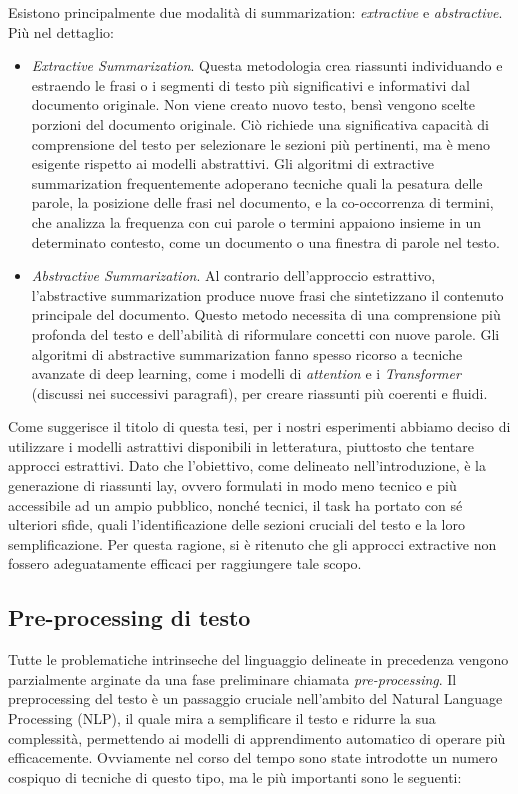 \documentclass[12pt,a4paper,twoside,openright]{book}
\begin{document}
Esistono principalmente due modalità di summarization: \emph{extractive} e \emph{abstractive}.
Più nel dettaglio:
\begin{itemize}
\item \emph{Extractive Summarization}. Questa metodologia crea riassunti individuando e estraendo le frasi o i segmenti di testo più significativi e informativi dal documento originale. Non viene creato nuovo testo, bensì vengono scelte porzioni del documento originale. Ciò richiede una significativa capacità di comprensione del testo per selezionare le sezioni più pertinenti, ma è meno esigente rispetto ai modelli abstrattivi.
Gli algoritmi di extractive summarization frequentemente adoperano tecniche quali la pesatura delle parole, la posizione delle frasi nel documento, e la co-occorrenza di termini, che analizza la frequenza con cui parole o termini appaiono insieme in un determinato contesto, come un documento o una finestra di parole nel testo.
\item \emph{Abstractive Summarization}. Al contrario dell'approccio estrattivo, l'abstractive summarization produce nuove frasi che sintetizzano il contenuto principale del documento. Questo metodo necessita di una comprensione più profonda del testo e dell'abilità di riformulare concetti con nuove parole. Gli algoritmi di abstractive summarization fanno spesso ricorso a tecniche avanzate di deep learning, come i modelli di \emph{attention} e i \emph{Transformer} (discussi nei successivi paragrafi), per creare riassunti più coerenti e fluidi.
\end{itemize}

Come suggerisce il titolo di questa tesi, per i nostri esperimenti abbiamo deciso di utilizzare i modelli astrattivi disponibili in letteratura, piuttosto che tentare approcci estrattivi. 
Dato che l'obiettivo, come delineato nell'introduzione, è la generazione di riassunti lay, ovvero formulati in modo meno tecnico e più accessibile ad un ampio pubblico, nonché tecnici, il task ha portato con sé ulteriori sfide, quali l'identificazione delle sezioni cruciali del testo e la loro semplificazione. Per questa ragione, si è ritenuto che gli approcci extractive non fossero adeguatamente efficaci per raggiungere tale scopo.


\subsection{Pre-processing di testo} 
\label{preproc}
Tutte le problematiche intrinseche del linguaggio delineate in precedenza vengono parzialmente arginate da una fase preliminare chiamata \emph{pre-processing}. 
Il preprocessing del testo è un passaggio cruciale nell'ambito del Natural Language Processing (NLP), il quale mira a semplificare il testo e ridurre la sua complessità, permettendo ai modelli di apprendimento automatico di operare più efficacemente.
Ovviamente nel corso del tempo sono state introdotte un numero cospiquo di tecniche di questo tipo, ma le più importanti sono le seguenti:
\end{document}
